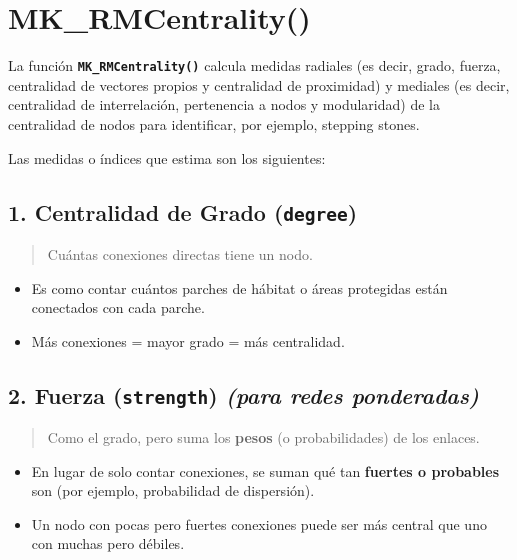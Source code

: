 \documentclass[
]{book}
\providecommand{\tightlist}{%
  \setlength{\itemsep}{0pt}\setlength{\parskip}{0pt}}
\begin{document}
\section{MK\_RMCentrality()}\label{mk_rmcentrality}

La función \textbf{\texttt{MK\_RMCentrality()}} calcula medidas radiales (es decir, grado, fuerza, centralidad de vectores propios y centralidad de proximidad) y mediales (es decir, centralidad de interrelación, pertenencia a nodos y modularidad) de la centralidad de nodos para identificar, por ejemplo, stepping stones.

Las medidas o índices que estima son los siguientes:

\subsection{\texorpdfstring{1. Centralidad de Grado (\texttt{degree})}{1. Centralidad de Grado (degree)}}\label{centralidad-de-grado-degree}

\begin{quote}
Cuántas conexiones directas tiene un nodo.
\end{quote}

\begin{itemize}
\tightlist
\item
  Es como contar cuántos parches de hábitat o áreas protegidas están conectados con cada parche.
\item
  Más conexiones = mayor grado = más centralidad.
\end{itemize}

\subsection{\texorpdfstring{2. Fuerza (\texttt{strength}) \emph{(para redes ponderadas)}}{2. Fuerza (strength) (para redes ponderadas)}}\label{fuerza-strength-para-redes-ponderadas}

\begin{quote}
Como el grado, pero suma los \textbf{pesos} (o probabilidades) de los enlaces.
\end{quote}

\begin{itemize}
\tightlist
\item
  En lugar de solo contar conexiones, se suman qué tan \textbf{fuertes o probables} son (por ejemplo, probabilidad de dispersión).
\item
  Un nodo con pocas pero fuertes conexiones puede ser más central que uno con muchas pero débiles.
\end{itemize}
\end{document}
